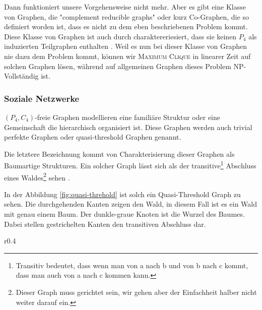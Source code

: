 \documentclass[12pt,a4paper,onecolumn,oneside,titlepage]{article}
\begin{document}
Dann funktioniert unsere Vorgehensweise nicht mehr. 
Aber es gibt eine Klasse von Graphen, die "complement reducible graphs" oder kurz Co-Graphen, die so definiert worden ist, dass es nicht zu dem eben beschriebenen Problem kommt.
Diese Klasse von Graphen ist auch durch charaktereriesiert, dass sie keinen $P_4$ als induzierten Teilgraphen enthalten \cite{NastosG13}.
Weil es nun bei dieser Klasse von Graphen nie dazu dem Problem kommt, können wir \textsc{Maximum Clique} in linearer Zeit auf solchen Graphen lösen, während auf allgemeinen Graphen dieses Problem NP-Vollständig ist.


\subsubsection{Soziale Netzwerke}
$(P_4,C_4)$-freie Graphen modellieren eine familiäre Struktur oder eine Gemeinschaft die hierarchisch organisiert ist. Diese Graphen werden auch trivial perfekte Graphen oder quasi-threshold Graphen genannt. 

Die letztere Bezeichnung kommt von Charakterisierung dieser Graphen als Baumartige Strukturen. Ein solcher Graph lässt sich als der transitive\footnote{Transitiv bedeutet, dass wenn man von a nach b und von b nach c kommt, dass man auch von a nach c kommen kann.} Abschluss eines Waldes\footnote{Dieser Graph muss gerichtet sein, wir gehen aber der Einfachheit halber nicht weiter darauf ein.} sehen\cite{Wolk65} . 

In der Abbildung \ref{fig:quasi-threhold} ist solch ein Quasi-Threshold Graph zu sehen. Die durchgehenden Kanten zeigen den Wald, in diesem Fall ist es ein Wald mit genau einem Baum. Der dunkle-graue Knoten ist die Wurzel des Baumes.  Dabei stellen gestrichelten Kanten den transitiven Abschluss dar. \cite{BrandesHSW15}
\begin{wrapfigure}{r}{0.4\textwidth}
  \begin{center}
    


  \end{center}
  \caption{Ein Quasi-Threshold-Graph}
  \label{fig:quasi-threhold}
\end{wrapfigure}
\end{document}
